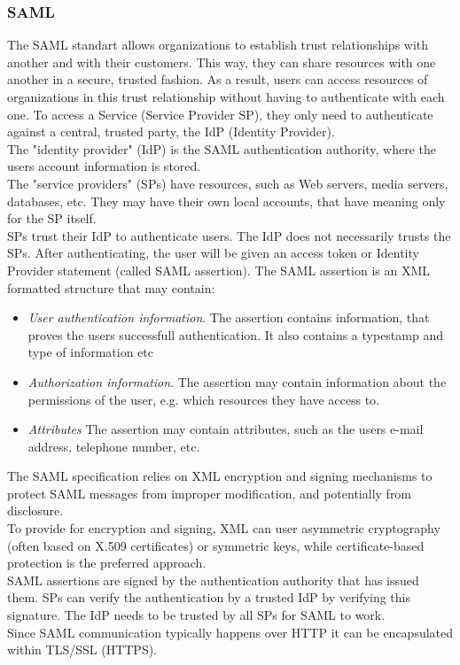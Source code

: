 \documentclass[12pt,a4paper]{univention}
\begin{document}
\subsubsection{SAML}
The SAML standart allows organizations to establish trust relationships with another and with their customers.
This way, they can share resources with one another in a secure, trusted fashion. As a result, users can access resources of organizations in this trust relationship without having to authenticate with each one. To access a Service (Service Provider SP), they only need to authenticate against a central, trusted party, the IdP (Identity Provider). \\
The "identity provider" (IdP) is the SAML authentication authority, where the users account information is stored.\\
The "service providers" (SPs) have resources, such as Web servers, media servers, databases, etc. They may have their own local accounts, that have meaning only for the SP itself.\\
SPs trust their IdP to authenticate users. The IdP does not necessarily trusts the SPs.  
After authenticating, the user will be given an access token or Identity Provider  statement (called SAML assertion). The SAML assertion is an XML formatted structure that may contain:
\begin{itemize}
 \item \textit{User authentication information}. The assertion contains information, that proves the users successfull authentication. It also contains a typestamp and type of information etc
 \item \textit{Authorization information}. The assertion may contain information about the permissions of the user, e.g. which resources they have access to.
 \item \textit{Attributes} The assertion may contain attributes, such as the users e-mail address, telephone number, etc.
 \end{itemize} 
 The SAML specification relies on XML encryption and signing mechanisms to protect SAML messages from improper modification, and potentially from disclosure.\\
To provide for encryption and signing, XML can user asymmetric cryptography (often based on X.509 certificates) or symmetric keys, while certificate-based protection is the preferred approach.\\
SAML assertions are signed by the authentication authority that has issued them. SPs can verify the authentication by a trusted IdP by verifying this signature. The IdP needs to be trusted by all SPs for SAML to work.\\
Since SAML communication typically happens over HTTP it can be encapsulated within TLS/SSL (HTTPS).\\
\end{document}
